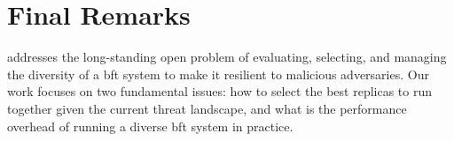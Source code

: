 \section{Final Remarks}
\label{sec:finalremarkslazarus}

\system addresses the long-standing open problem of evaluating, selecting, and managing the diversity of a \gls{bft} system to make it resilient to malicious adversaries.
Our work focuses on two fundamental issues: how to select the best replicas to run together given the current threat landscape, and what is the performance overhead of running a diverse \gls{bft} system in practice.

